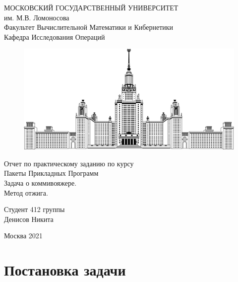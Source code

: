 \documentclass[14pt,a4paper]{scrartcl}
\begin{document}
	\begin{center}
		МОСКОВСКИЙ ГОСУДАРСТВЕННЫЙ УНИВЕРСИТЕТ
		\\
		им. М.В. Ломоносова
		\\
		\bigskip
		Факультет Вычислительной Математики и Кибернетики
		\\
		\bigskip
		Кафедра Исследования Операций
	\end{center}
	\begin{figure}[h]
		\centering
		\includegraphics[width=0.8\linewidth]{MSU}
	\end{figure}
	\begin{center}
		Отчет по практическому заданию по курсу
		\\
		Пакеты Прикладных Программ
		\\
		\bigskip
		Задача о коммивояжере.
		\\
		Метод отжига.
	\end{center}
	\bigskip
	\begin{flushright}
		Студент 412 группы
		\\
		Денисов Никита
	\end{flushright}
	\vfill
	\begin{center}
		Москва 2021
	\end{center}
	\newpage
	\tableofcontents
	\newpage
	\section{Постановка задачи}
\end{document}
